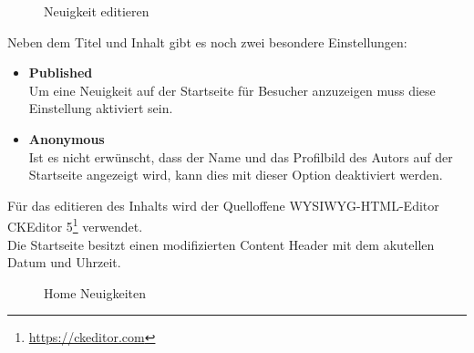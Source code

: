 \begin{figure}[H]
  \centering
  \caption{Neuigkeit editieren}
\end{figure}

Neben dem Titel und Inhalt gibt es noch zwei besondere Einstellungen:

\begin{itemize}
  \item \textbf{Published}\\
  Um eine Neuigkeit auf der Startseite für Besucher anzuzeigen muss diese
  Einstellung aktiviert sein. 
  \item \textbf{Anonymous}\\
  Ist es nicht erwünscht, dass der Name und das Profilbild des Autors auf der
  Startseite angezeigt wird, kann dies mit dieser Option deaktiviert werden.
\end{itemize}

Für das editieren des Inhalts wird der Quelloffene \acs*{WYSIWYG}-HTML-Editor
CKEditor 5\footnote{\url{https://ckeditor.com}} verwendet.\\

Die Startseite besitzt einen modifizierten Content Header mit dem akutellen
Datum und Uhrzeit.

\begin{figure}[H]
  \centering
  \caption{Home Neuigkeiten}
\end{figure}


